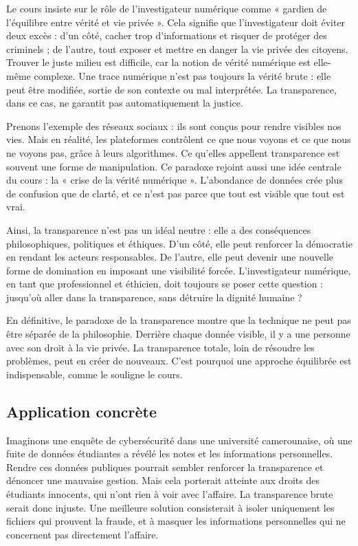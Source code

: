 \documentclass[12pt,a4paper]{report}
\begin{document}
	Le cours insiste sur le rôle de l’investigateur numérique comme « gardien de l’équilibre entre 
	vérité et vie privée ». Cela signifie que l’investigateur doit éviter deux excès : d’un côté, 
	cacher trop d’informations et risquer de protéger des criminels ; de l’autre, tout exposer et 
	mettre en danger la vie privée des citoyens. Trouver le juste milieu est difficile, car la 
	notion de vérité numérique est elle-même complexe. Une trace numérique n’est pas toujours 
	la vérité brute : elle peut être modifiée, sortie de son contexte ou mal interprétée. La 
	transparence, dans ce cas, ne garantit pas automatiquement la justice.  
	
	Prenons l’exemple des réseaux sociaux : ils sont conçus pour rendre visibles nos vies. 
	Mais en réalité, les plateformes contrôlent ce que nous voyons et ce que nous ne voyons pas, 
	grâce à leurs algorithmes. Ce qu’elles appellent transparence est souvent une forme de 
	manipulation. Ce paradoxe rejoint aussi une idée centrale du cours : la « crise de la vérité 
	numérique ». L’abondance de données crée plus de confusion que de clarté, et ce n’est pas 
	parce que tout est visible que tout est vrai.  
	
	Ainsi, la transparence n’est pas un idéal neutre : elle a des conséquences philosophiques, 
	politiques et éthiques. D’un côté, elle peut renforcer la démocratie en rendant les acteurs 
	responsables. De l’autre, elle peut devenir une nouvelle forme de domination en imposant 
	une visibilité forcée. L’investigateur numérique, en tant que professionnel et éthicien, doit 
	toujours se poser cette question : jusqu’où aller dans la transparence, sans détruire la 
	dignité humaine ?  
	
	En définitive, le paradoxe de la transparence montre que la technique ne peut pas être séparée 
	de la philosophie. Derrière chaque donnée visible, il y a une personne avec son droit à la vie 
	privée. La transparence totale, loin de résoudre les problèmes, peut en créer de nouveaux. 
	C’est pourquoi une approche équilibrée est indispensable, comme le souligne le cours.  
	
	\subsection*{Application concrète}
	
	Imaginons une enquête de cybersécurité dans une université camerounaise, où une fuite de 
	données étudiantes a révélé les notes et les informations personnelles. Rendre ces données 
	publiques pourrait sembler renforcer la transparence et dénoncer une mauvaise gestion. 
	Mais cela porterait atteinte aux droits des étudiants innocents, qui n’ont rien à voir avec 
	l’affaire. La transparence brute serait donc injuste.  
	Une meilleure solution consisterait à isoler uniquement les fichiers qui prouvent la fraude, 
	et à masquer les informations personnelles qui ne concernent pas directement l’affaire.  
	
\end{document}
